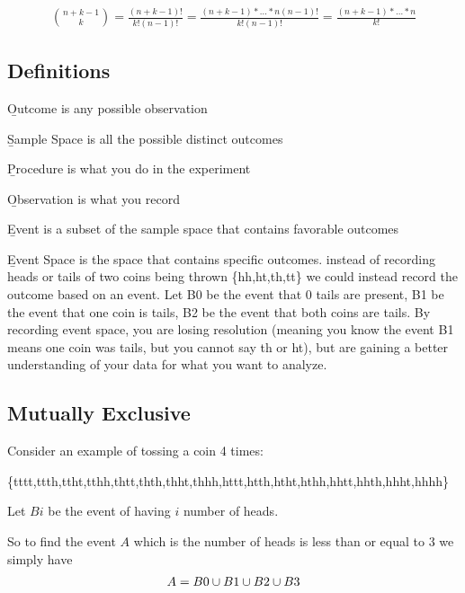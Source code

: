 \documentclass[12pt, titlepage, oneside]{article}
\begin{document}
\begin{align}
{n + k - 1 \choose k}  = \frac{(n+k-1)!}{k! (n-1)!} =
 \frac{ (n + k -1)*\dots*n (n-1)!}{k! (n-1)!} = \frac{(n+k-1)*\dots*n}{k!} 
\end{align}

\subsection{Definitions}

\b{Outcome} is any possible observation

\b{Sample Space} is all the possible distinct outcomes

\b{Procedure} is what you do in the experiment

\b{Observation} is what you record

\b{Event} is a subset of the sample space that contains favorable outcomes

\b{Event Space} is the space that contains specific outcomes. \ex instead of recording heads or tails of two coins being thrown \{hh,ht,th,tt\} we could instead record the outcome based on an event. Let B0 be the event that 0 tails are present, B1 be the event that one coin is tails, B2 be the event that both coins are tails. By recording event space, you are losing resolution (meaning you know the event B1 means one coin was tails, but you cannot say th or ht), but are gaining a better understanding of your data for what you want to analyze.


\subsection{Mutually Exclusive }

Consider an example of tossing a coin 4 times:

\{tttt,ttth,ttht,tthh,thtt,thth,thht,thhh,httt,htth,htht,hthh,hhtt,hhth,hhht,hhhh\}

Let $Bi$ be the event of having $i$ number of heads.

So to find the event $A$ which is the number of heads is less than or equal to 3 we simply have
\begin{align*}
A = B0 \cup B1 \cup B2 \cup B3
\end{align*}
\end{document}
